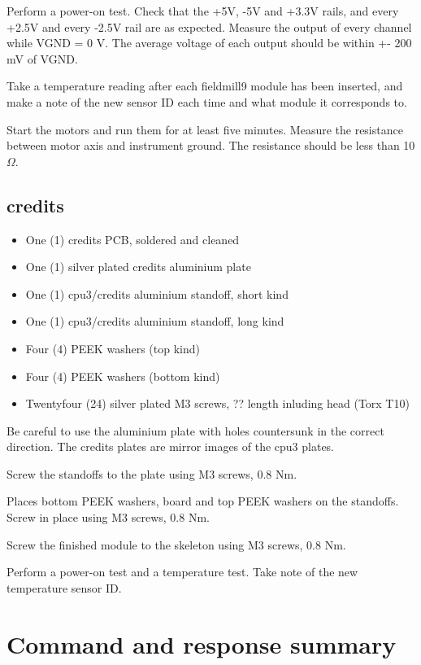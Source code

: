 \documentclass{article}
\begin{document}
Perform a power-on test.
Check that the +5V, -5V and +3.3V rails, and every +2.5V and every -2.5V rail are as expected.
Measure the output of every channel while VGND = 0 V. The average voltage of each output should be within +- 200 mV of VGND.

Take a temperature reading after each fieldmill9 module has been inserted,
and make a note of the new sensor ID each time and what module it corresponds to.

Start the motors and run them for at least five minutes.
Measure the resistance between motor axis and instrument ground.
The resistance should be less than 10 $\Omega$.

\subsection{credits}

\begin{itemize}
\item One (1) credits PCB, soldered and cleaned
\item One (1) silver plated credits aluminium plate
\item One (1) cpu3/credits aluminium standoff, short kind
\item One (1) cpu3/credits aluminium standoff, long kind
\item Four (4) PEEK washers (top kind)
\item Four (4) PEEK washers (bottom kind)
\item Twentyfour (24) silver plated M3 screws, ?? length inluding head (Torx T10)
\end{itemize}

Be careful to use the aluminium plate with holes countersunk in the correct direction.
The credits plates are mirror images of the cpu3 plates.

Screw the standoffs to the plate using M3 screws, 0.8 Nm.

Places bottom PEEK washers, board and top PEEK washers on the standoffs.
Screw in place using M3 screws, 0.8 Nm.

Screw the finished module to the skeleton using M3 screws, 0.8 Nm.

Perform a power-on test and a temperature test.
Take note of the new temperature sensor ID.

\newpage
\section{Command and response summary}
\end{document}
